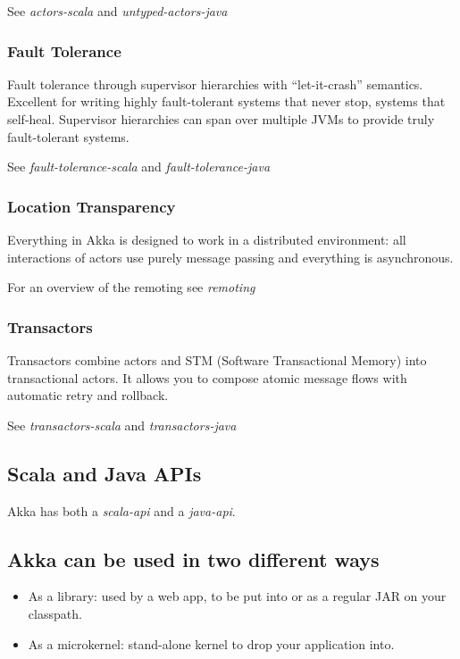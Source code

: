 \documentclass[a4paper,10pt,oneside,openany]{sphinxmanual}
\begin{document}
See \emph{actors-scala} and \emph{untyped-actors-java}


\subsubsection{Fault Tolerance}
\label{intro/what-is-scala-words:fault-tolerance}
Fault tolerance through supervisor hierarchies with ``let-it-crash''
semantics. Excellent for writing highly fault-tolerant systems that never stop,
systems that self-heal. Supervisor hierarchies can span over multiple JVMs to
provide truly fault-tolerant systems.

See \emph{fault-tolerance-scala} and \emph{fault-tolerance-java}


\subsubsection{Location Transparency}
\label{intro/what-is-scala-words:location-transparency}
Everything in Akka is designed to work in a distributed environment: all
interactions of actors use purely message passing and everything is asynchronous.

For an overview of the remoting see \emph{remoting}


\subsubsection{Transactors}
\label{intro/what-is-scala-words:transactors}
Transactors combine actors and STM (Software Transactional Memory) into transactional actors.
It allows you to compose atomic message flows with automatic retry and rollback.

See \emph{transactors-scala} and \emph{transactors-java}


\subsection{Scala and Java APIs}
\label{intro/what-is-scala-words:scala-and-java-apis}
Akka has both a \emph{scala-api} and a \emph{java-api}.


\subsection{Akka can be used in two different ways}
\label{intro/what-is-scala-words:akka-can-be-used-in-two-different-ways}\begin{itemize}
\item {} 
As a library: used by a web app, to be put into  or as a regular
JAR on your classpath.

\item {} 
As a microkernel: stand-alone kernel to drop your application into.

\end{itemize}
\end{document}
